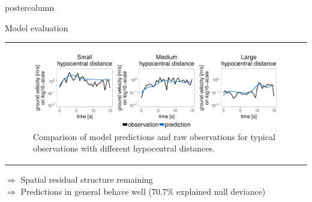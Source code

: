\documentclass[final,hyperref={pdfpagelabels=false}]{beamer}
\newcommand{\bfGreen}[1]{\textcolor{koalablue}{\textbf{#1}}}
\newcommand*\circled[1]{\tikz[baseline=(char.base)]{
\node[shape=circle,draw,inner sep=2pt] (char) {#1};}}
\begin{document}
\begin{frame}
\begin{columns}
\begin{column}{1\textwidth}
\begin{columns}[T]
\begin{column}{.484\textwidth}
\begin{beamercolorbox}[center,wd=\textwidth]{postercolumn}
\begin{minipage}[T]{.95\textwidth}
\begin{block}{\footnotesize \circled{3} Model evaluation}
\begin{center}
\begin{tabularx}{0.975\linewidth}{Z}
  \begin{figure}[!ht]\centering
  \includegraphics[width=0.6\linewidth]{figures/predictions}
  \caption{\footnotesize Comparison of model predictions and raw observations for typical observations with different hypocentral distances.}
  \end{figure}
\end{tabularx}
\end{center}

\vspace{-2ex}
\textcolor{koalablue}{$\Rightarrow$} Spatial residual structure remaining \\[0.15cm]
\textcolor{koalablue}{$\Rightarrow$} Predictions in general behave well (70.7\% explained null deviance)

\end{block}


\end{minipage}
\end{beamercolorbox}
\end{column}
\end{columns}
\end{column}
\end{columns}
\end{frame}
\end{document}
